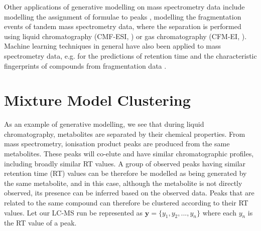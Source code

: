 Other applications of generative modelling on mass spectrometry data include modelling the assignment of formulae to peaks \cite{Rogers2009a, Silva2014}, modelling the fragmentation events of tandem mass spectrometry data, where the separation is performed using liquid chromatography (CMF-ESI, \cite{Allen2014}) or gas chromatography (CFM-EI, \cite{Allen2016}). Machine learning techniques in general have also been applied to mass spectrometry data, e.g. for the predictions of retention time \cite{Creek2011, Cao2015, Stanstrup2015} and the characteristic fingerprints of compounds from fragmentation data \cite{Heinonen2012a, Duhrkop2015}. 



\section{Mixture Model Clustering}
\label{sub:background-mixture-model-clustering}

As an example of generative modelling, we see that during liquid chromatography, metabolites are separated by their chemical properties. From mass spectrometry, ionisation product peaks are produced from the same metabolites. These peaks will co-elute and have similar chromatographic profiles, including broadly similar RT values. A group of observed peaks having similar retention time (RT) values can be therefore be modelled as being generated by the same metabolite, and in this case, although the metabolite is not directly observed, its presence can be inferred based on the observed data. Peaks that are related to the same compound can therefore be clustered according to their RT values. Let our LC-MS run be represented as $\mathbf{y}=\{y_{1},y_{2},...,y_{n}\}$ where each $y_n$ is the RT value of a peak. 

